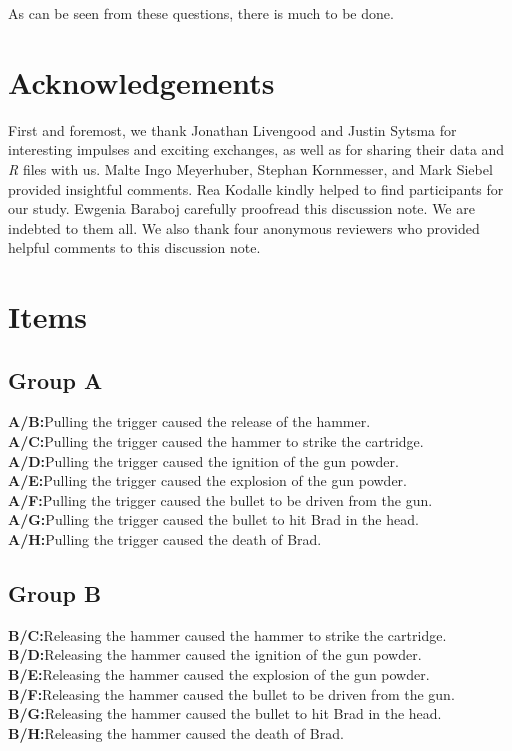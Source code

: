 \documentclass[12pt]{scrartcl}
\begin{document}
As can be seen from these questions, there is much to be done.

\section*{Acknowledgements}
First and foremost, we thank Jonathan Livengood and Justin Sytsma for interesting impulses and exciting exchanges, as well as for sharing their data and \textit{R} files with us. Malte Ingo Meyerhuber, Stephan Kornmesser, and Mark Siebel provided insightful comments. Rea Kodalle kindly helped to find participants for our study. Ewgenia Baraboj carefully proofread this discussion note. We are indebted to them all. We also thank four anonymous reviewers who provided helpful comments to this discussion note.

\clearpage
\appendix
\section{Items}
\label{app:combinations}
\subsection*{Group A}
\noindent\textbf{\textsf{A/B:}}\tab Pulling the trigger caused the release of the hammer.\\
\noindent\textbf{\textsf{A/C:}}\tab Pulling the trigger caused the hammer to strike the cartridge.\\
\noindent\textbf{\textsf{A/D:}}\tab Pulling the trigger caused the ignition of the gun powder.\\
\noindent\textbf{\textsf{A/E:}}\tab Pulling the trigger caused the explosion of the gun powder.\\
\noindent\textbf{\textsf{A/F:}}\tab Pulling the trigger caused the bullet to be driven from the gun.\\
\noindent\textbf{\textsf{A/G:}}\tab Pulling the trigger caused the bullet to hit Brad in the head.\\
\noindent\textbf{\textsf{A/H:}}\tab Pulling the trigger caused the death of Brad.

\subsection*{Group B}
\noindent\textbf{\textsf{B/C:}}\tab Releasing the hammer caused the hammer to strike the cartridge.\\
\noindent\textbf{\textsf{B/D:}}\tab Releasing the hammer caused the ignition of the gun powder.\\
\noindent\textbf{\textsf{B/E:}}\tab Releasing the hammer caused the explosion of the gun powder.\\
\noindent\textbf{\textsf{B/F:}}\tab Releasing the hammer caused the bullet to be driven from the gun.\\
\noindent\textbf{\textsf{B/G:}}\tab Releasing the hammer caused the bullet to hit Brad in the head.\\
\noindent\textbf{\textsf{B/H:}}\tab Releasing the hammer caused the death of Brad.
\end{document}
